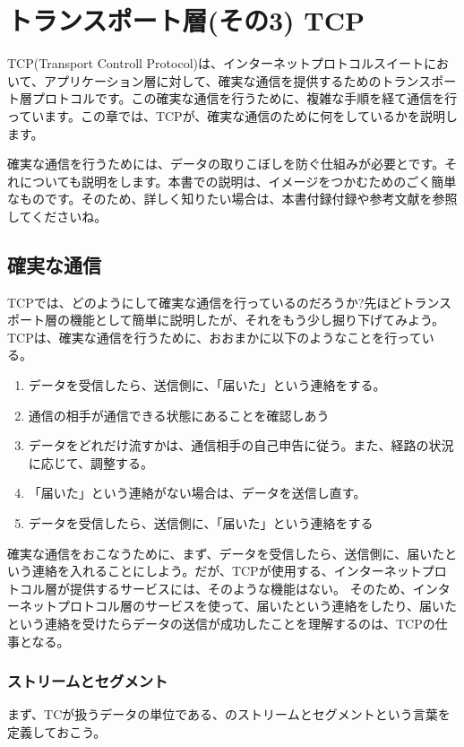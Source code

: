 \chapter{トランスポート層(その3) TCP}


TCP(Transport Controll Protocol)は、インターネットプロトコルスイートにおいて、アプリケーション層に対して、確実な通信を提供するためのトランスポート層プロトコルです。この確実な通信を行うために、複雑な手順を経て通信を行っています。この章では、TCPが、確実な通信のために何をしているかを説明します。

確実な通信を行うためには、データの取りこぼしを防ぐ仕組みが必要とです。それについても説明をします。本書での説明は、イメージをつかむためのごく簡単なものです。そのため、詳しく知りたい場合は、本書付録付録や参考文献を参照してくださいね。

\section{確実な通信}

TCPでは、どのようにして確実な通信を行っているのだろうか?先ほどトランスポート層の機能として簡単に説明したが、それをもう少し掘り下げてみよう。
TCPは、確実な通信を行うために、おおまかに以下のようなことを行っている。

\begin{enumerate}
\item データを受信したら、送信側に、「届いた」という連絡をする。
\item 通信の相手が通信できる状態にあることを確認しあう
\item データをどれだけ流すかは、通信相手の自己申告に従う。また、経路の状況に応じて、調整する。
\item 「届いた」という連絡がない場合は、データを送信し直す。
\item データを受信したら、送信側に、「届いた」という連絡をする
\end{enumerate}


確実な通信をおこなうために、まず、データを受信したら、送信側に、届いたという連絡を入れることにしよう。だが、TCPが使用する、インターネットプロトコル層が提供するサービスには、そのような機能はない。
そのため、インターネットプロトコル層のサービスを使って、届いたという連絡をしたり、届いたという連絡を受けたらデータの送信が成功したことを理解するのは、TCPの仕事となる。

\subsection{ストリームとセグメント}
まず、TCが扱うデータの単位である、のストリームとセグメントという言葉を定義しておこう。


